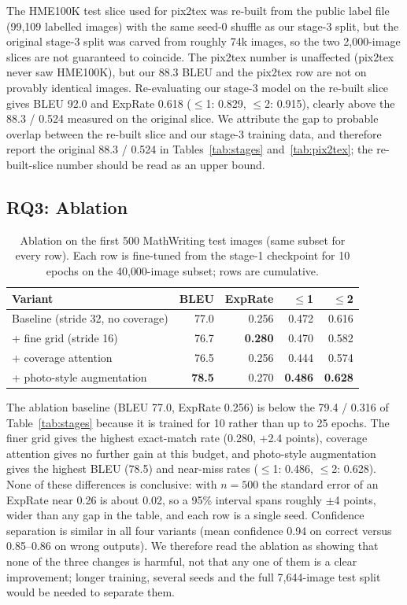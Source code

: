 \documentclass[conference]{IEEEtran}
\begin{document}
The HME100K test slice used for pix2tex was re-built from the public label file (99{,}109 labelled images) with the same seed-0 shuffle as our stage-3 split, but the original stage-3 split was carved from roughly 74k images, so the two 2{,}000-image slices are not guaranteed to coincide. The pix2tex number is unaffected (pix2tex never saw HME100K), but our 88.3 BLEU and the pix2tex row are not on provably identical images. Re-evaluating our stage-3 model on the re-built slice gives BLEU 92.0 and ExpRate 0.618 ($\le$1: 0.829, $\le$2: 0.915), clearly above the 88.3 / 0.524 measured on the original slice. We attribute the gap to probable overlap between the re-built slice and our stage-3 training data, and therefore report the original 88.3 / 0.524 in Tables~\ref{tab:stages} and~\ref{tab:pix2tex}; the re-built-slice number should be read as an upper bound.

\subsection{RQ3: Ablation}
\begin{table}[t]
\caption{Ablation on the first 500 MathWriting test images (same subset for every row). Each row is fine-tuned from the stage-1 checkpoint for 10 epochs on the 40{,}000-image subset; rows are cumulative.}
\label{tab:ablation}
\centering
\setlength{\tabcolsep}{4pt}
\begin{tabular}{lrrrr}
\toprule
Variant & BLEU & ExpRate & $\le$1 & $\le$2 \\
\midrule
Baseline (stride 32, no coverage) & 77.0 & 0.256 & 0.472 & 0.616 \\
+ fine grid (stride 16) & 76.7 & \textbf{0.280} & 0.470 & 0.582 \\
+ coverage attention & 76.5 & 0.256 & 0.444 & 0.574 \\
+ photo-style augmentation & \textbf{78.5} & 0.270 & \textbf{0.486} & \textbf{0.628} \\
\bottomrule
\end{tabular}
\end{table}

The ablation baseline (BLEU 77.0, ExpRate 0.256) is below the 79.4 / 0.316 of Table~\ref{tab:stages} because it is trained for 10 rather than up to 25 epochs. The finer grid gives the highest exact-match rate (0.280, $+$2.4 points), coverage attention gives no further gain at this budget, and photo-style augmentation gives the highest BLEU (78.5) and near-miss rates ($\le$1: 0.486, $\le$2: 0.628). None of these differences is conclusive: with $n=500$ the standard error of an ExpRate near 0.26 is about 0.02, so a 95\% interval spans roughly $\pm$4 points, wider than any gap in the table, and each row is a single seed. Confidence separation is similar in all four variants (mean confidence 0.94 on correct versus 0.85--0.86 on wrong outputs). We therefore read the ablation as showing that none of the three changes is harmful, not that any one of them is a clear improvement; longer training, several seeds and the full 7{,}644-image test split would be needed to separate them.
\end{document}

